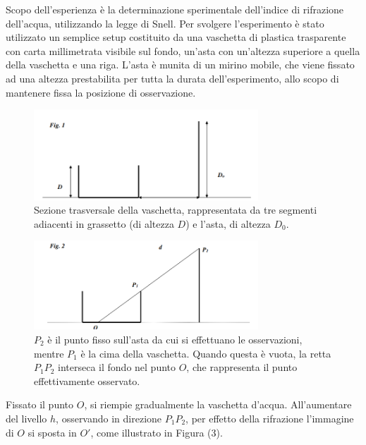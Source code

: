 Scopo dell'esperienza è la determinazione sperimentale dell'indice di rifrazione dell'acqua,
utilizzando la legge di Snell. Per svolgere l'esperimento è stato utilizzato un semplice setup costituito da una vaschetta di plastica trasparente con carta millimetrata visibile sul fondo, un'asta con un'altezza superiore a quella della vaschetta e una riga. L'asta è munita di un mirino mobile, che viene fissato ad una altezza prestabilita per tutta la durata dell'esperimento, allo scopo di  mantenere fissa la posizione di osservazione.

\begin{figure}[H]
	\centering
	\includegraphics[width=0.75\textwidth]{./figures/Im1}
	\caption{Sezione trasversale della vaschetta, rappresentata da tre segmenti adiacenti in grassetto (di altezza $D$) e l'asta, di altezza $D_0$.}
\end{figure}

\begin{figure}[H]
	\centering
	\includegraphics[width=0.75\textwidth]{./figures/Im2}
	\caption{$P_2$ è il punto fisso sull'asta da cui si effettuano le osservazioni, mentre $P_1$ è la cima della vaschetta. Quando questa è vuota, la retta $P_1P_2$ interseca il fondo nel punto $O$, che rappresenta il punto effettivamente osservato.}
\end{figure}

Fissato il punto $O$, si riempie gradualmente la vaschetta d'acqua. All'aumentare del livello $h$, osservando in direzione $P_1 P_2$, per effetto della rifrazione l'immagine di $O$ si sposta in $O'$, come illustrato in Figura (3).

